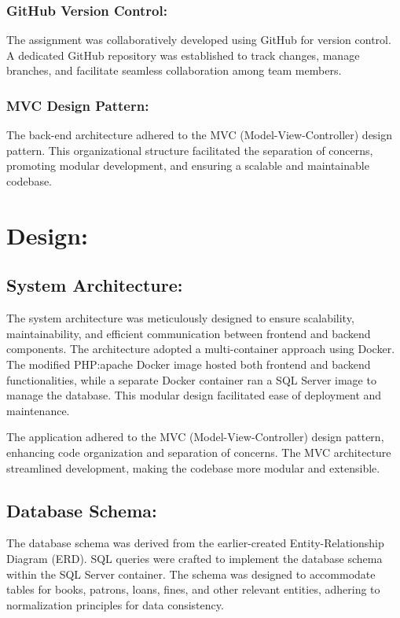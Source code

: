 \documentclass[12pt,titlepage,a4paper]{report}
\begin{document}
\subsection{GitHub Version Control:}
\noindent
The assignment was collaboratively developed using GitHub for version control. A dedicated GitHub repository was established to track changes, manage branches, and facilitate seamless collaboration among team members.

\subsection{MVC Design Pattern:}
\noindent
The back-end architecture adhered to the MVC (Model-View-Controller) design pattern. This organizational structure facilitated the separation of concerns, promoting modular development, and ensuring a scalable and maintainable codebase.

\chapter{Design:}

\section{System Architecture:}
The system architecture was meticulously designed to ensure scalability, maintainability, and efficient communication between frontend and backend components. The architecture adopted a multi-container approach using Docker. The modified PHP:apache Docker image hosted both frontend and backend functionalities, while a separate Docker container ran a SQL Server image to manage the database. This modular design facilitated ease of deployment and maintenance.

The application adhered to the MVC (Model-View-Controller) design pattern, enhancing code organization and separation of concerns. The MVC architecture streamlined development, making the codebase more modular and extensible.

\newpage

\section{Database Schema:}

The database schema was derived from the earlier-created Entity-Relationship Diagram (ERD). SQL queries were crafted to implement the database schema within the SQL Server container. The schema was designed to accommodate tables for books, patrons, loans, fines, and other relevant entities, adhering to normalization principles for data consistency.
\end{document}
